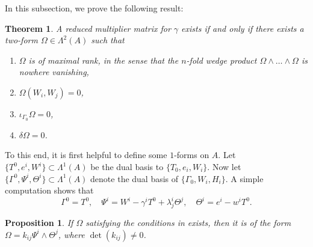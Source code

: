 \documentclass[11pt]{article}
\theoremstyle{plain}
\newtheorem{theorem}{Theorem}
\newtheorem{proposition}{Proposition}
\theoremstyle{definition}
\begin{document}
In this subsection, we prove the following result:
\begin{theorem}\label{thm:twoform}
A reduced multiplier matrix for $\gamma$ exists if and only if there exists a two-form $\Omega\in \Lambda^2(A)$ such that
\begin{enumerate}
    \item $\Omega$ is of maximal rank, in the sense that the $n$-fold wedge product $\Omega\wedge \dots\wedge \Omega$ is nowhere vanishing, 
    \item $\Omega(W_i,W_j)=0$,
    \item $\iota_{\Gamma_0} \Omega=0$,
    \item $\delta \Omega=0$.
\end{enumerate}
\end{theorem}
To this end, it is first helpful to define some $1$-forms on $A$. Let $\{T^0,e^i,W^i\}\subset \Lambda^1(A)$ be the dual basis to $\{T_0,e_i,W_i\}$. Now let $\{\Gamma^0,\Psi^i,\Theta^i\}\subset \Lambda^1(A)$ denote the dual basis of $\{\Gamma_0,W_i,H_i\}$. A simple computation shows that
\begin{equation*}
    \Gamma^0=T^0,\quad \Psi^i=W^i-\gamma^i T^0+\lambda_j^i \Theta^j,\quad \Theta^i=e^i-w^i T^0.
\end{equation*}
\begin{proposition}
If $\Omega$ satisfying the conditions in  exists, then it is of the form $\Omega=k_{ij}\Psi^i\wedge \Theta^j$, where $\det(k_{ij})\neq 0$.
\end{proposition}
\end{document}
